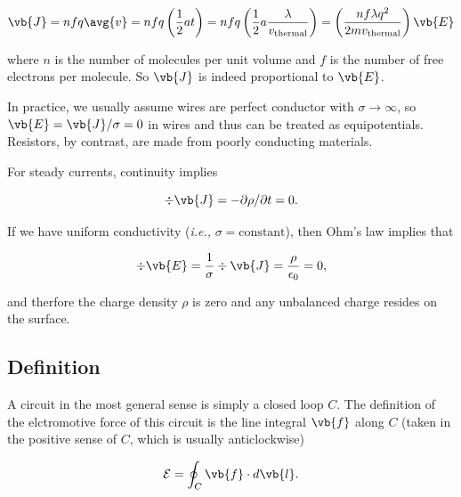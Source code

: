 \documentclass[english,a4paper,12pt]{report}
\begin{document}
\begin{equation}
    \vb{J} = nfq\avg{v} = nfq \left( \frac{1}{2}at \right) = nfq \left( \frac{1}{2}a\frac{\lambda}{v_{\text{thermal} } }  \right) = \left( \frac{nf\lambda q^2}{2mv_{\text{thermal} } }  \right) \vb{E}  
\end{equation}

where \(n\) is the number of molecules per unit volume and \(f\) is the number of free electrons per molecule. So \(\vb{J} \) is indeed proportional to \(\vb{E} \).  

In practice, we usually assume wires are perfect conductor with \(\sigma \rightarrow \infty\), so \(\vb{E} = \vb{J} /\sigma  =0\) in wires and thus can be treated as equipotentials. Resistors, by contrast, are made from poorly conducting materials. 

For steady currents, continuity implies

\begin{equation}
    \div{\vb{J} } = - \partial \rho /\partial t = 0.
\end{equation}

If we have uniform conductivity (\textit{i.e.,} \(\sigma = \text{constant}  \)), then Ohm's law implies that 

\begin{equation}
    \div{\vb{E} } = \frac{1}{\sigma } \div{\vb{J} } = \frac{\rho }{\epsilon_0 } = 0, 
\end{equation}

and therfore the charge density \(\rho \) is zero and any unbalanced charge resides on the surface.

\subsection{Definition}


A circuit in the most general sense is simply a closed loop \(C\). The definition of the elctromotive force of this circuit is the line integral \(\vb{f} \) along \(C\) (taken in the positive sense of \(C\), which is usually anticlockwise)  

\begin{equation}
    \mathcal{E} = \oint_{C}  \vb{f} \cdot d \vb{l} .
\end{equation}
\end{document}
